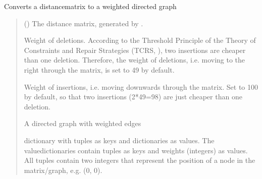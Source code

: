 \documentclass[letterpaper,10pt,english]{sphinxmanual}
\begin{document}
\begin{fulllineitems}
\label{\detokenize{documentation:loanpy.scapplier.mtx2graph}}
\pysigstartsignatures
{}
\pysigstopsignatures
\sphinxAtStartPar
Converts a distance\sphinxhyphen{}matrix to a weighted directed graph
\begin{quote}\begin{description}
\sphinxAtStartPar
{} () \textendash{} The distance matrix, generated by .

\sphinxAtStartPar
Weight of deletions. According to the Threshold Principle of the
Theory of Constraints and Repair Strategies (TCRS,
),
two insertions are cheaper than one deletion. Therefore,
the weight of deletions, i.e. moving to the right through the
matrix, is set to 49 by default.

\sphinxAtStartPar
Weight of insertions, i.e. moving downwards through the matrix.
Set to 100 by default, so that two insertions
(2*49=98) are just cheaper than one deletion.

\sphinxAtStartPar
A directed graph with weighted edges

\sphinxAtStartPar
dictionary with tuples as keys and dictionaries as values.
The value\sphinxhyphen{}dictionaries contain tuples as keys and weights
(integers) as values.
All tuples contain two integers that represent the position
of a node in the matrix/graph, e.g. (0, 0).


\end{description}
\end{quote}
\end{fulllineitems}
\end{document}
